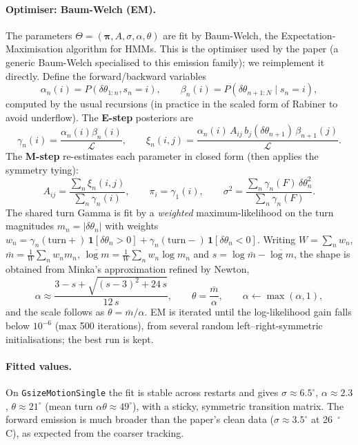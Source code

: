\documentclass{article}
\begin{document}
\paragraph{Optimiser: Baum-Welch (EM).}
The parameters $\Theta=(\boldsymbol\pi,A,\sigma,\alpha,\theta)$ are fit by
Baum-Welch, the Expectation-Maximisation algorithm for HMMs. This is the
optimiser used by the paper (a generic Baum-Welch specialised to this emission
family); we reimplement it directly. Define the forward/backward variables
\[
\alpha_n(i)=P(\delta\theta_{1:n},s_n=i),\qquad
\beta_n(i)=P(\delta\theta_{n+1:N}\mid s_n=i),
\]
computed by the usual recursions (in practice in the scaled form of Rabiner to
avoid underflow). The \textbf{E-step} posteriors are
\[
\gamma_n(i)=\frac{\alpha_n(i)\beta_n(i)}{\mathcal L},\qquad
\xi_n(i,j)=\frac{\alpha_n(i)\,A_{ij}\,b_j(\delta\theta_{n+1})\,\beta_{n+1}(j)}{\mathcal L}.
\]
The \textbf{M-step} re-estimates each parameter in closed form (then applies the
symmetry tying):
\[
A_{ij}=\frac{\sum_n \xi_n(i,j)}{\sum_n \gamma_n(i)},\qquad
\pi_i=\gamma_1(i),\qquad
\sigma^2=\frac{\sum_n \gamma_n(F)\,\delta\theta_n^2}{\sum_n \gamma_n(F)} .
\]
The shared turn Gamma is fit by a \emph{weighted} maximum-likelihood on the turn
magnitudes $m_n=|\delta\theta_n|$ with weights
$w_n=\gamma_n(\text{turn}+)\,\mathbf 1[\delta\theta_n>0]
     +\gamma_n(\text{turn}-)\,\mathbf 1[\delta\theta_n<0]$. Writing
$W=\sum_n w_n$, $\bar m=\tfrac1W\sum_n w_n m_n$,
$\overline{\log m}=\tfrac1W\sum_n w_n\log m_n$ and
$s=\log\bar m-\overline{\log m}$, the shape is obtained from Minka's
approximation refined by Newton,
\[
\alpha \approx \frac{3-s+\sqrt{(s-3)^2+24\,s}}{12\,s},\qquad
\theta=\frac{\bar m}{\alpha},\qquad \alpha\leftarrow\max(\alpha,1),
\]
and the scale follows as $\theta=\bar m/\alpha$. EM is iterated until the
log-likelihood gain falls below $10^{-6}$ (max 500 iterations), from several
random left--right-symmetric initialisations; the best run is kept.

\paragraph{Fitted values.}
On \texttt{GsizeMotionSingle} the fit is stable across restarts and gives
$\sigma\approx6.5^\circ$, $\alpha\approx2.3$, $\theta\approx21^\circ$ (mean turn
$\alpha\theta\approx49^\circ$), with a sticky, symmetric transition matrix. The
forward emission is much broader than the paper's clean data
($\sigma\approx3.5^\circ$ at 26~$^\circ$C), as expected from the coarser
tracking.
\end{document}
